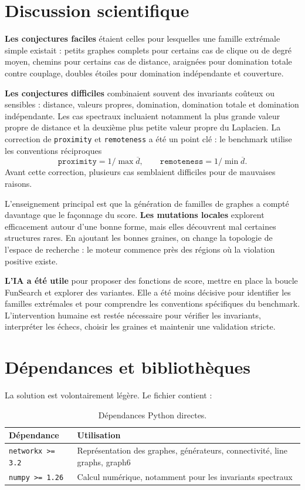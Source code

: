 \documentclass[11pt,a4paper]{article}
\begin{document}
\section{Discussion scientifique}

\textbf{Les conjectures faciles} étaient celles pour lesquelles une famille extrémale simple existait : petits graphes complets pour certains cas de clique ou de degré moyen, chemins pour certains cas de distance, araignées pour domination totale contre couplage, doubles étoiles pour domination indépendante et couverture.

\textbf{Les conjectures difficiles} combinaient souvent des invariants coûteux ou sensibles : distance, valeurs propres, domination, domination totale et domination indépendante. Les cas spectraux incluaient notamment la plus grande valeur propre de distance et la deuxième plus petite valeur propre du Laplacien. La correction de \texttt{proximity} et \texttt{remoteness} a été un point clé : le benchmark utilise les conventions réciproques
\[
\texttt{proximity}=1/\max \overline{d}, \qquad
\texttt{remoteness}=1/\min \overline{d}.
\]
Avant cette correction, plusieurs cas semblaient difficiles pour de mauvaises raisons.

L'enseignement principal est que la génération de familles de graphes a compté davantage que le façonnage du score. \textbf{Les mutations locales} explorent efficacement autour d'une bonne forme, mais elles découvrent mal certaines structures rares. En ajoutant les bonnes graines, on change la topologie de l'espace de recherche : le moteur commence près des régions où la violation positive existe.

\textbf{L'IA a été utile} pour proposer des fonctions de score, mettre en place la boucle FunSearch et explorer des variantes. Elle a été moins décisive pour identifier les familles extrémales et pour comprendre les conventions spécifiques du benchmark. L'intervention humaine est restée nécessaire pour vérifier les invariants, interpréter les échecs, choisir les graines et maintenir une validation stricte.

\section{Dépendances et bibliothèques}

La solution est volontairement légère. Le fichier  contient :

\begin{table}[H]
\centering
\begin{tabular}{ll}
\toprule
Dépendance & Utilisation \\
\midrule
\texttt{networkx >= 3.2} & Représentation des graphes, générateurs, connectivité, line graphs, graph6 \\
\texttt{numpy >= 1.26} & Calcul numérique, notamment pour les invariants spectraux \\
\bottomrule
\end{tabular}
\caption{Dépendances Python directes.}
\end{table}
\end{document}
